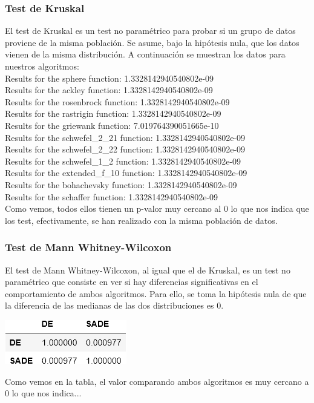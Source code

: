 \documentclass[11pt, a4paper, titlepage]{article}
\begin{document}
\subsubsection{Test de Kruskal}
\vspace{5mm}
El test de Kruskal es un test no paramétrico para probar si un grupo de datos proviene de la misma población. Se asume, bajo la hipótesis nula, que los datos vienen de la misma distribución. A continuación se muestran los datos para nuestros algoritmos:\\
Results for the sphere function: 1.3328142940540802e-09\\
Results for the ackley function: 1.3328142940540802e-09\\
Results for the rosenbrock function: 1.3328142940540802e-09\\
Results for the rastrigin function: 1.3328142940540802e-09\\
Results for the griewank function: 7.019764390051665e-10\\
Results for the schwefel\_2\_21 function: 1.3328142940540802e-09\\
Results for the schwefel\_2\_22 function: 1.3328142940540802e-09\\
Results for the schwefel\_1\_2 function: 1.3328142940540802e-09\\
Results for the extended\_f\_10 function: 1.3328142940540802e-09\\
Results for the bohachevsky function: 1.3328142940540802e-09\\
Results for the schaffer function: 1.3328142940540802e-09\\
Como vemos, todos ellos tienen un p-valor muy cercano al 0 lo que nos indica que los test, efectivamente, se han realizado con la misma población de datos.
\subsubsection{Test de Mann Whitney-Wilcoxon}
\vspace{5mm}
El test de Mann Whitney-Wilcoxon, al igual que el de Kruskal, es un test no paramétrico que consiste en ver si hay diferencias significativas en el comportamiento de ambos algoritmos. Para ello, se toma la hipótesis nula de que la diferencia de las medianas de las dos distribuciones es 0.
\begin{center}
\includegraphics[scale=0.85]{tableWhitney.png}
\end{center}
Como vemos en la tabla, el valor comparando ambos algoritmos es muy cercano a 0 lo que nos indica...
\end{document}

